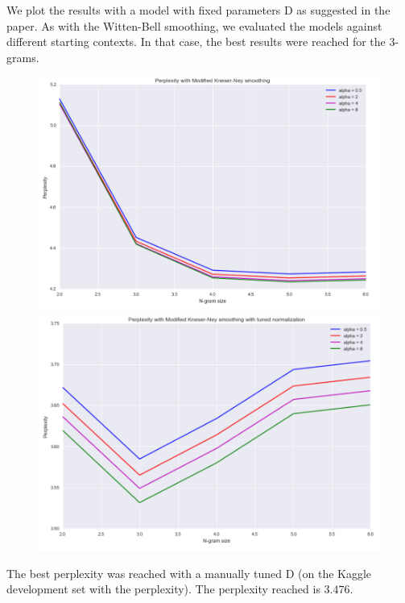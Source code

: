 \documentclass[11pt]{article}
\begin{document}
We plot the results with a model with fixed parameters D as suggested in the paper. As with the Witten-Bell smoothing, we evaluated the models against different starting contexts. In that case, the best results were reached for the 3-grams.

\begin{figure}[H]
  \centering
  \begin{minipage}[b]{0.45\textwidth}
    \includegraphics[width=\textwidth]{perp_mkn}
  \end{minipage}
  \hfill
  \begin{minipage}[b]{0.45\textwidth}
    \includegraphics[width=\textwidth]{perp_mkn_norm}
  \end{minipage}
\end{figure}


The best perplexity was reached with a manually tuned D (on the Kaggle development set with the perplexity). The perplexity reached is $\mathbb{3.476}$.
\end{document}
